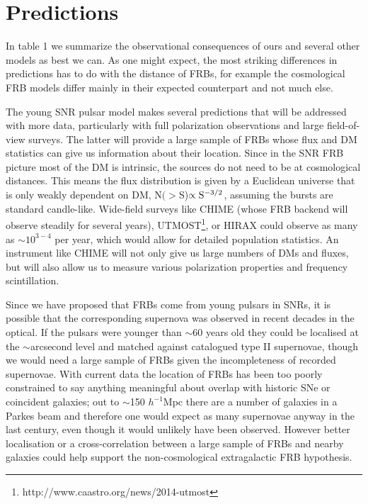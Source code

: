 \documentclass[useAMS,usenatbib]{mn2e}
\begin{document}
\section{Predictions}
\label{sec-predictions}

In table 1 we summarize the observational consequences
of ours and several other models as best we can. As one might expect,
the most striking differences in predictions has to do with the distance of FRBs,
for example the cosmological FRB models differ mainly in their expected
counterpart and not much else. 

The young SNR pulsar model makes several predictions that will
be addressed with more data, particularly with full polarization 
observations and large field-of-view surveys. 
The latter will provide a large sample of FRBs whose flux and DM statistics
 can give us information about their location. Since in the SNR FRB picture
most of the DM is intrinsic, the sources do not need to be at cosmological 
distances. This means the flux distribution is given by a Euclidean universe
that is only weakly dependent on DM, N$(>$S)$ \propto \rm S^{-3/2}$, assuming
the bursts are standard candle-like.
Wide-field surveys
like CHIME \citep{2014SPIE.9145E..22B} (whose FRB backend will 
observe steadily for several years), 
UTMOST\footnote{http://www.caastro.org/news/2014-utmost},
 or HIRAX could observe as many as $\sim10^{3-4}$
per year, which would allow for detailed population statistics. An instrument like 
CHIME will not only give us large numbers of DMs and fluxes, but will also allow 
us to measure various polarization properties and frequency scintillation. %

Since we have proposed that FRBs come from young pulsars 
in SNRs, it is possible that the corresponding 
supernova was observed in recent decades in the optical. If the pulsars
were younger than $\sim$60 years old they could be localised at the 
$\sim$arcsecond level
and matched against catalogued type II supernovae, though we would need a 
large sample of FRBs given the incompleteness of recorded supernovae. With
current data the location of FRBs has been too poorly constrained to say anything 
meaningful about overlap with historic SNe or coincident galaxies; 
out to $\sim$150 $h^{-1}$Mpc 
there are a number of galaxies in a Parkes beam and therefore one would 
expect as many supernovae anyway in the last century, even though it would unlikely 
have been observed. However better localisation or a cross-correlation between
a large sample of FRBs and nearby galaxies could help support the non-cosmological
extragalactic FRB hypothesis.
\end{document}
